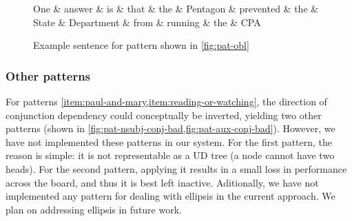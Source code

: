 \documentclass[11pt,a4paper]{article}
\begin{document}
\begin{figure*}[ht]
    \centering
    \begin{dependency}
    \begin{deptext}[column sep=0.1cm]
    One \& answer \& is \& that \& the \& Pentagon \& prevented \& the \& State \& Department \& from \& running \& the \& CPA  \\
    \end{deptext}
    \end{dependency}
    \caption{Example sentence for pattern shown in \cref{fig:pat-obl}}
    \label{fig:rel-clause}
\end{figure*}



\subsubsection{Other patterns}
For patterns \cref{item:paul-and-mary,item:reading-or-watching},
the direction of conjunction dependency could conceptually be
inverted, yielding two other patterns (shown in
\cref{fig:pat-nsubj-conj-bad,fig:pat-aux-conj-bad}). However, we
have not implemented these patterns in our system. For the first
pattern, the reason is simple: it is not representable as a UD
tree (a node cannot have two heads). For the second pattern,
applying it results in a small loss in performance across the
board, and thus it is best left inactive.  Aditionally, we have
not implemented any pattern for dealing with ellipsis in the
current approach. We plan on addressing ellipsis in future work.
\end{document}
